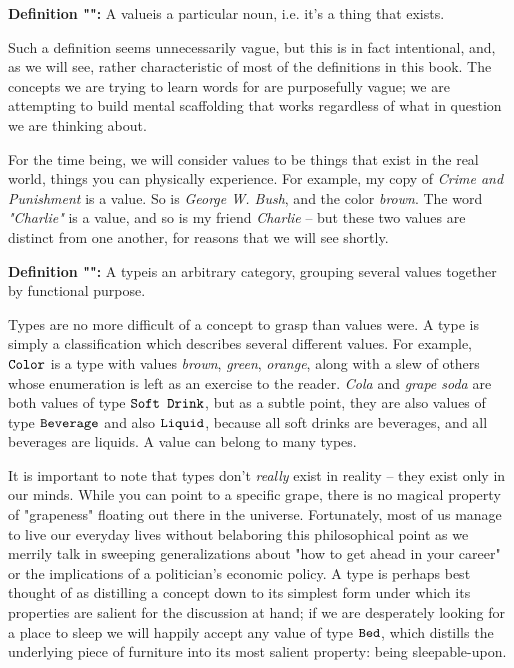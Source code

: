 \documentclass[12pt]{book}
\newcommand{\aside}[1]{#1}
\renewcommand{\value}[1]{\textit{#1}}
\newcommand{\type}[1]{\text{\texttt{#1}}}
\newcommand{\what}{}
\newcommand{\defn}[2]{\renewcommand{\what}{#1}\textbf{Definition "\titlecap{#1}":} #2}
\begin{document}
\defn{value}{A \what is a particular noun, i.e. it's a thing that exists.}

\aside{Such a definition seems unnecessarily vague, but this is in fact intentional, and, as we will see, rather
characteristic of most of the definitions in this book. The concepts we are trying to learn words for are purposefully
vague; we are attempting to build mental scaffolding that works regardless of what in question we are thinking about.}

For the time being, we will consider values to be things that exist in the real world, things you can physically
experience. For example, my copy of \value{Crime and Punishment} is a value. So is \value{George W. Bush}, and the color
\value{brown}. The word \value{"Charlie"} is a value, and so is my friend \value{Charlie} -- but these two values are
distinct from one another, for reasons that we will see shortly.

\defn{type}{A \what is an arbitrary category, grouping several values together by functional purpose.}

Types are no more difficult of a concept to grasp than values were. A type is simply a classification which describes
several different values. For example, $\type{Color}$ is a type with values \value{brown}, \value{green},
\value{orange}, along with a slew of others whose enumeration is left as an exercise to the reader. \value{Cola} and
\value{grape soda} are both values of type $\type{Soft Drink}$, but as a subtle point, they are also values of type
$\type{Beverage}$ and also $\type{Liquid}$, because all soft drinks are beverages, and all beverages are liquids. A
value can belong to many types.

It is important to note that types don't \textit{really} exist in reality -- they exist only in our minds. While you can
point to a specific grape, there is no magical property of "grapeness" floating out there in the universe. Fortunately,
most of us manage to live our everyday lives without belaboring this philosophical point as we merrily talk in sweeping
generalizations about "how to get ahead in your career" or the implications of a politician's economic
policy. A type is perhaps best thought of as distilling a concept down to
its simplest form under which its properties are salient for the discussion at hand; if we are desperately looking for a
place to sleep we will happily accept any value of type $\type{Bed}$, which distills the underlying piece of furniture
into its most salient property: being sleepable-upon.
\end{document}

